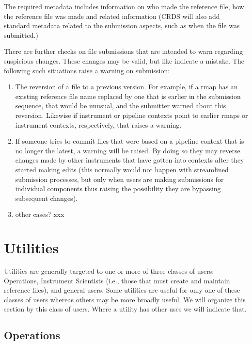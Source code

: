 \documentclass[final,authoryear,5p,times,twocolumn]{elsarticle}
\begin{document}
The required metadata includes information on who made the reference file, how
the reference file was made and related information (CRDS will also add
standard metadata related to the submission aspects, such as when the file was
submitted.)

There are further checks on file submissions that are intended to warn regarding
suspicious changes. These changes may be valid, but like indicate a mistake. The
following such situations raise a warning on submission:

\begin{enumerate}
\item The reversion of a file to a previous version. For example, 
if a rmap has an
existing reference file name replaced by one that is earlier in the submission
sequence, that would be unusual, and the submitter warned about this reversion.
Likewise if instrument or pipeline contexts point to earlier rmaps or instrument
contexts, respectively, that raises a warning.

\item If someone tries to commit files that were based on a pipeline context that
is no longer the latest, a warning will be raised. By doing so they may reverse
changes made by other instruments that have gotten into contexts after they
started making edits (this normally would not happen with streamlined submission
processes, but only when users are making submissions for individual components
thus raising the possibility they are bypassing subsequent changes).

\item other cases? xxx
\end{enumerate}

\section{Utilities}

Utilities are generally targeted to one or more of three classes of users:
Operations, Instrument Scientists (i.e., those that must create and maintain
reference files), and general users. Some utilities are useful for only one of
these classes of users whereas others may be more broadly useful. We will
organize this section by this class of users. Where a utility has other uses we
will indicate that.

\subsection{Operations}
\end{document}
